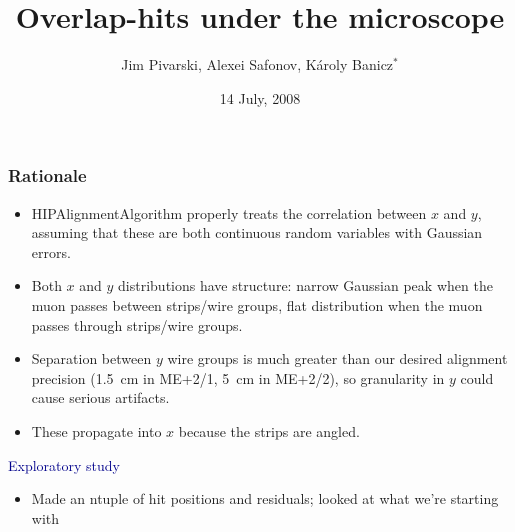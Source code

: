 \documentclass[compress]{beamer}
\title{Overlap-hits under the microscope}
\author{Jim Pivarski, Alexei Safonov, K\'aroly Banicz$^*$}
\institute{Texas A\&M University, $^*$US-CMS}
\date{14 July, 2008}
\begin{document}
\frame{\titlepage}


\begin{frame}
\frametitle{Rationale}
\begin{itemize}\setlength{\itemsep}{0.2 cm}
\item HIPAlignmentAlgorithm properly treats the correlation between $x$ and
$y$, assuming that these are both continuous random variables with
Gaussian errors.

\item Both $x$ and $y$ distributions have structure: narrow Gaussian
  peak when the muon passes between strips/wire groups, flat
  distribution when the muon passes through strips/wire groups.

\item Separation between $y$ wire groups is much greater than our
  desired alignment precision (1.5~cm in ME+2/1, 5~cm in ME+2/2), so
  granularity in $y$ could cause serious artifacts.

\item These propagate into $x$ because the strips are angled.

\end{itemize}

\vspace{0.2 cm}
\hspace{-0.83 cm} \textcolor{darkblue}{\Large Exploratory study}

\vspace{0.15 cm}
\begin{itemize}
\item Made an ntuple of hit positions and residuals; looked at what we're starting with
\end{itemize}

\end{frame}
\end{document}
